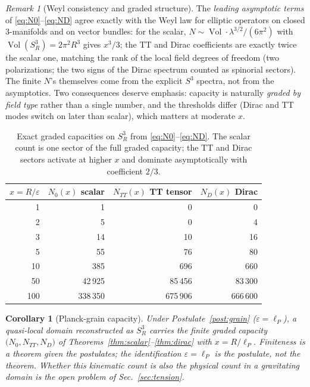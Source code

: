 \documentclass[11pt,a4paper]{article}
\newtheorem{corollary}[theorem]{Corollary}
\theoremstyle{definition}
\theoremstyle{remark}
\newtheorem{remark}[theorem]{Remark}
\newcommand{\Sthree}{S^{3}}
\newcommand{\lP}{\ell_{P}}
\begin{document}
\begin{remark}[Weyl consistency and graded structure]
\label{rem:weyl}
The \emph{leading asymptotic terms} of \eqref{eq:N0}--\eqref{eq:ND} agree exactly with the
Weyl law for elliptic operators on closed $3$-manifolds and on vector bundles: for the scalar,
$N\sim\operatorname{Vol}\cdot\lambda^{3/2}/(6\pi^{2})$ with
$\operatorname{Vol}(\Sthree_{R})=2\pi^{2}R^{3}$ gives $x^{3}/3$; the TT and Dirac coefficients
are exactly twice the scalar one, matching the rank of the local field degrees of freedom (two
polarizations; the two signs of the Dirac spectrum counted as spinorial sectors).  The finite $N$'s themselves come from the explicit
$\Sthree$ spectra, not from the asymptotics.  Two consequences deserve emphasis: capacity is
naturally \emph{graded by field type} rather than a single number, and the thresholds differ
(Dirac and TT modes switch on later than scalar), which matters at moderate $x$.
\end{remark}

\begin{table}[ht]
\centering
\small
\begin{tabular}{r r r r}
\toprule
$x=R/\varepsilon$ & $N_{0}(x)$ scalar & $N_{TT}(x)$ TT tensor & $N_{D}(x)$ Dirac\\
\midrule
1   & 1        & 0        & 0\\
2   & 5        & 0        & 4\\
3   & 14       & 10       & 16\\
5   & 55       & 76       & 80\\
10  & 385      & 696      & 660\\
50  & 42\,925  & 85\,456  & 83\,300\\
100 & 338\,350 & 675\,906 & 666\,600\\
\bottomrule
\end{tabular}
\caption{Exact graded capacities on $\Sthree_{R}$ from
\eqref{eq:N0}--\eqref{eq:ND}.  The scalar count is one sector of the full graded capacity; the
TT and Dirac sectors activate at higher $x$ and dominate asymptotically with coefficient
$2/3$.}
\label{tab:capacity}
\end{table}

\begin{corollary}[Planck-grain capacity]
\label{cor:planck}
Under Postulate~\ref{post:grain} ($\varepsilon=\lP$), a quasi-local domain reconstructed as
$\Sthree_{R}$ carries the finite graded capacity
$\big(N_{0},N_{TT},N_{D}\big)$ of Theorems~\ref{thm:scalar}--\ref{thm:dirac} with $x=R/\lP$.
Finiteness is a theorem given the postulates; the identification $\varepsilon=\lP$ is the
postulate, not the theorem.  Whether this kinematic count is also the \emph{physical} count in
a gravitating domain is the open problem of Sec.~\ref{sec:tension}.
\end{corollary}
\end{document}
